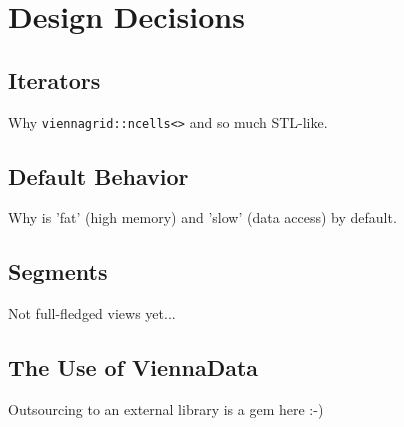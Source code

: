 \chapter{Design Decisions} \label{chap:design}

 \section{Iterators}
 Why \lstinline|viennagrid::ncells<>| and so much STL-like.

 \section{Default Behavior}
 Why {\ViennaGrid} is 'fat' (high memory) and 'slow' (data access) by default.

 \section{Segments}
 Not full-fledged views yet...

 \section{The Use of ViennaData}
 Outsourcing to an external library is a gem here :-)